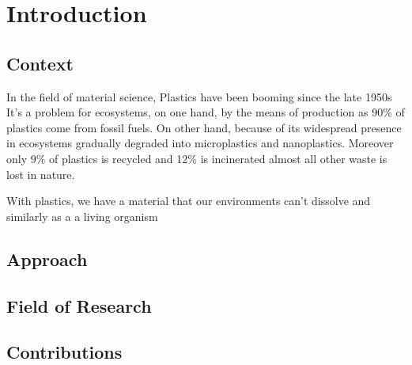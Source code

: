 \chapter{Introduction}

\section{Context}

In the field of material science, Plastics have been booming since the late 1950s\cite{geyer2017production}
It's a problem for ecosystems, on one hand, by the means of production as 90\% of plastics come from fossil fuels. On other hand,
because of its widespread presence in ecosystems gradually degraded into microplastics and nanoplastics.
Moreover only 9\% of plastics is recycled and 12\% is incinerated almost all other waste is lost in nature.\cite{natureeditorial} 

With plastics, we have a material that our environments can't dissolve and similarly as a a living organism  
\section{Approach}

\section{Field of Research}
\section{Contributions}